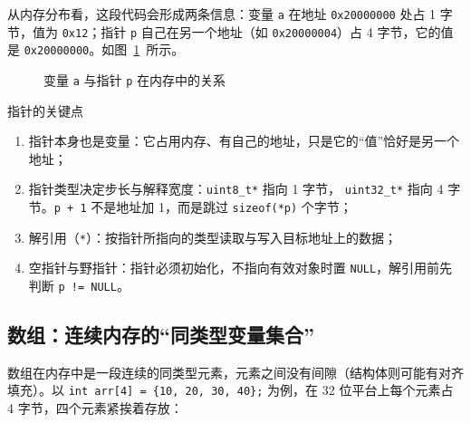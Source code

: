 从内存分布看，这段代码会形成两条信息：变量 \texttt{a} 在地址 \texttt{0x20000000} 处占 1 字节，值为 \texttt{0x12}；指针 \texttt{p} 自己在另一个地址（如 \texttt{0x20000004}）占 4 字节，它的值是 \texttt{0x20000000}。如图~\ref{fig:pointer-memory}~所示。

\begin{figure}[htbp]
\centering
\caption{变量 \texttt{a} 与指针 \texttt{p} 在内存中的关系} \label{fig:pointer-memory}
\end{figure}

\begin{anybox}{指针的关键点}

\begin{enumerate}
\item 指针本身也是变量：它占用内存、有自己的地址，只是它的“值”恰好是另一个地址；
\item 指针类型决定步长与解释宽度：\texttt{uint8\_t*} 指向 1 字节， \texttt{uint32\_t*} 指向 4 字节。\texttt{p + 1} 不是地址加 1，而是跳过 \texttt{sizeof(*p)} 个字节；
\item 解引用（\texttt{*}）：按指针所指向的类型读取与写入目标地址上的数据；
\item 空指针与野指针：指针必须初始化，不指向有效对象时置 \texttt{NULL}，解引用前先判断 \texttt{p != NULL}。
\end{enumerate}

\end{anybox}
\subsection{数组：连续内存的“同类型变量集合”}

数组在内存中是一段连续的同类型元素，元素之间没有间隙（结构体则可能有对齐填充）。以 \texttt{int arr[4] = \{10, 20, 30, 40\};} 为例，在 32 位平台上每个元素占 4 字节，四个元素紧挨着存放：

